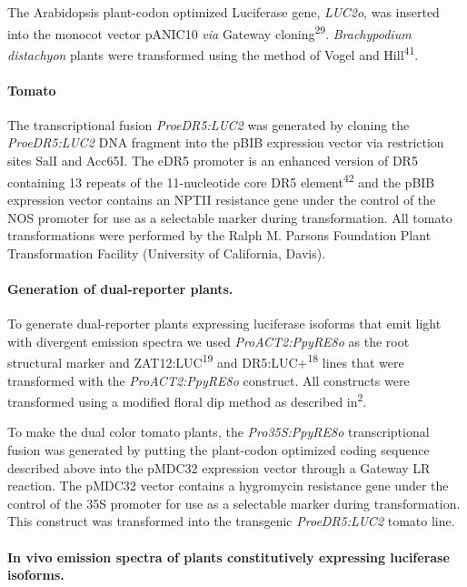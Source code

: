 \documentclass[]{article}
\begin{document}
The Arabidopsis plant-codon optimized Luciferase gene, \emph{LUC2o}, was
inserted into the monocot vector pANIC10 \emph{via} Gateway
cloning\textsuperscript{29}. \emph{Brachypodium distachyon} plants were
transformed using the method of Vogel and Hill\textsuperscript{41}.

\paragraph{Tomato}\label{tomato}

The transcriptional fusion \emph{ProeDR5:LUC2} was generated by cloning
the \emph{ProeDR5:LUC2} DNA fragment into the pBIB expression vector via
restriction sites SalI and Acc65I. The eDR5 promoter is an enhanced
version of DR5 containing 13 repeats of the 11-nucleotide core DR5
element\textsuperscript{42} and the pBIB expression vector contains an
NPTII resistance gene under the control of the NOS promoter for use as a
selectable marker during transformation. All tomato transformations were
performed by the Ralph M. Parsons Foundation Plant Transformation
Facility (University of California, Davis).

\paragraph{Generation of dual-reporter
plants.}\label{generation-of-dual-reporter-plants.}

To generate dual-reporter plants expressing luciferase isoforms that
emit light with divergent emission spectra we used
\emph{ProACT2:PpyRE8o} as the root structural marker and
ZAT12:LUC\textsuperscript{19} and DR5:LUC+\textsuperscript{18} lines
that were transformed with the \emph{ProACT2:PpyRE8o} construct. All
constructs were transformed using a modified floral dip method as
described in\textsuperscript{2}.

To make the dual color tomato plants, the \emph{Pro35S:PpyRE8o}
transcriptional fusion was generated by putting the plant-codon
optimized coding sequence described above into the pMDC32 expression
vector through a Gateway LR reaction. The pMDC32 vector contains a
hygromycin resistance gene under the control of the 35S promoter for use
as a selectable marker during transformation. This construct was
transformed into the transgenic \emph{ProeDR5:LUC2} tomato line.

\paragraph{In vivo emission spectra of plants constitutively expressing
luciferase
isoforms.}\label{in-vivo-emission-spectra-of-plants-constitutively-expressing-luciferase-isoforms.}
\end{document}
